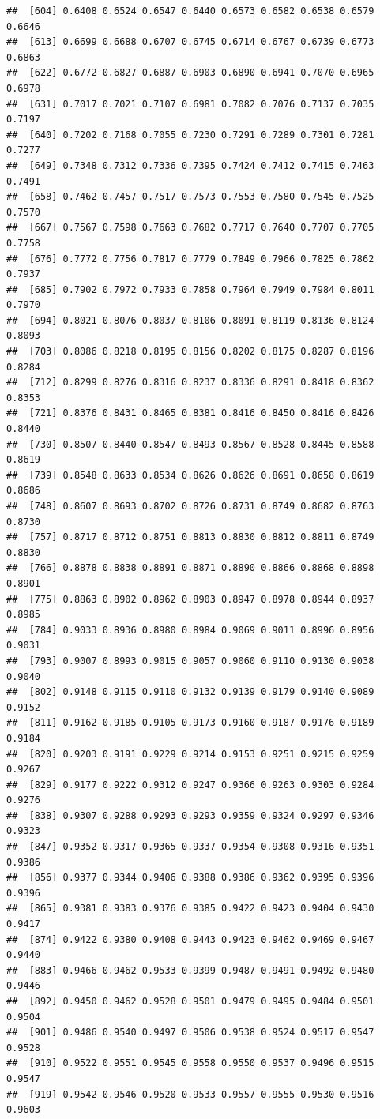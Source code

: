 \documentclass[]{article}
\begin{document}
\begin{verbatim}
##  [604] 0.6408 0.6524 0.6547 0.6440 0.6573 0.6582 0.6538 0.6579 0.6646
##  [613] 0.6699 0.6688 0.6707 0.6745 0.6714 0.6767 0.6739 0.6773 0.6863
##  [622] 0.6772 0.6827 0.6887 0.6903 0.6890 0.6941 0.7070 0.6965 0.6978
##  [631] 0.7017 0.7021 0.7107 0.6981 0.7082 0.7076 0.7137 0.7035 0.7197
##  [640] 0.7202 0.7168 0.7055 0.7230 0.7291 0.7289 0.7301 0.7281 0.7277
##  [649] 0.7348 0.7312 0.7336 0.7395 0.7424 0.7412 0.7415 0.7463 0.7491
##  [658] 0.7462 0.7457 0.7517 0.7573 0.7553 0.7580 0.7545 0.7525 0.7570
##  [667] 0.7567 0.7598 0.7663 0.7682 0.7717 0.7640 0.7707 0.7705 0.7758
##  [676] 0.7772 0.7756 0.7817 0.7779 0.7849 0.7966 0.7825 0.7862 0.7937
##  [685] 0.7902 0.7972 0.7933 0.7858 0.7964 0.7949 0.7984 0.8011 0.7970
##  [694] 0.8021 0.8076 0.8037 0.8106 0.8091 0.8119 0.8136 0.8124 0.8093
##  [703] 0.8086 0.8218 0.8195 0.8156 0.8202 0.8175 0.8287 0.8196 0.8284
##  [712] 0.8299 0.8276 0.8316 0.8237 0.8336 0.8291 0.8418 0.8362 0.8353
##  [721] 0.8376 0.8431 0.8465 0.8381 0.8416 0.8450 0.8416 0.8426 0.8440
##  [730] 0.8507 0.8440 0.8547 0.8493 0.8567 0.8528 0.8445 0.8588 0.8619
##  [739] 0.8548 0.8633 0.8534 0.8626 0.8626 0.8691 0.8658 0.8619 0.8686
##  [748] 0.8607 0.8693 0.8702 0.8726 0.8731 0.8749 0.8682 0.8763 0.8730
##  [757] 0.8717 0.8712 0.8751 0.8813 0.8830 0.8812 0.8811 0.8749 0.8830
##  [766] 0.8878 0.8838 0.8891 0.8871 0.8890 0.8866 0.8868 0.8898 0.8901
##  [775] 0.8863 0.8902 0.8962 0.8903 0.8947 0.8978 0.8944 0.8937 0.8985
##  [784] 0.9033 0.8936 0.8980 0.8984 0.9069 0.9011 0.8996 0.8956 0.9031
##  [793] 0.9007 0.8993 0.9015 0.9057 0.9060 0.9110 0.9130 0.9038 0.9040
##  [802] 0.9148 0.9115 0.9110 0.9132 0.9139 0.9179 0.9140 0.9089 0.9152
##  [811] 0.9162 0.9185 0.9105 0.9173 0.9160 0.9187 0.9176 0.9189 0.9184
##  [820] 0.9203 0.9191 0.9229 0.9214 0.9153 0.9251 0.9215 0.9259 0.9267
##  [829] 0.9177 0.9222 0.9312 0.9247 0.9366 0.9263 0.9303 0.9284 0.9276
##  [838] 0.9307 0.9288 0.9293 0.9293 0.9359 0.9324 0.9297 0.9346 0.9323
##  [847] 0.9352 0.9317 0.9365 0.9337 0.9354 0.9308 0.9316 0.9351 0.9386
##  [856] 0.9377 0.9344 0.9406 0.9388 0.9386 0.9362 0.9395 0.9396 0.9396
##  [865] 0.9381 0.9383 0.9376 0.9385 0.9422 0.9423 0.9404 0.9430 0.9417
##  [874] 0.9422 0.9380 0.9408 0.9443 0.9423 0.9462 0.9469 0.9467 0.9440
##  [883] 0.9466 0.9462 0.9533 0.9399 0.9487 0.9491 0.9492 0.9480 0.9446
##  [892] 0.9450 0.9462 0.9528 0.9501 0.9479 0.9495 0.9484 0.9501 0.9504
##  [901] 0.9486 0.9540 0.9497 0.9506 0.9538 0.9524 0.9517 0.9547 0.9528
##  [910] 0.9522 0.9551 0.9545 0.9558 0.9550 0.9537 0.9496 0.9515 0.9547
##  [919] 0.9542 0.9546 0.9520 0.9533 0.9557 0.9555 0.9530 0.9516 0.9603

\end{verbatim}
\end{document}

